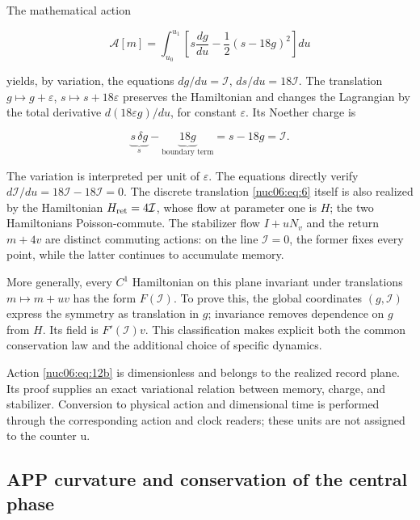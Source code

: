 The mathematical action

\begin{equation}
\mathscr A[m]=\int_{u_0}^{u_1}
\left[s\frac{dg}{du}-\frac12(s-18g)^2\right]du
\label{nuc06:eq:12b}
\end{equation}

yields, by variation, the equations \(dg/du=\mathcal I\), \(ds/du=18\mathcal I\). The translation \(g\mapsto g+\varepsilon\), \(s\mapsto s+18\varepsilon\) preserves the Hamiltonian and changes the Lagrangian by the total derivative \(d(18\varepsilon g)/du\), for constant \(\varepsilon\). Its Noether charge is

\begin{equation}
\underbrace{s\,\delta g}_{s}
-\underbrace{18g}_{\text{boundary term}}
=s-18g=\mathcal I.
\label{nuc06:eq:12c}
\end{equation}

The variation is interpreted per unit of \(\varepsilon\). The equations directly verify \(d\mathcal I/du=18\mathcal I-18\mathcal I=0\). The discrete translation \eqref{nuc06:eq:6} itself is also realized by the Hamiltonian \(H_{\rm ret}=4\mathcal I\), whose flow at parameter one is \(H\); the two Hamiltonians Poisson-commute. The stabilizer flow \(I+uN_v\) and the return \(m+4v\) are distinct commuting actions: on the line \(\mathcal I=0\), the former fixes every point, while the latter continues to accumulate memory.

More generally, every \(C^1\) Hamiltonian on this plane invariant under translations \(m\mapsto m+uv\) has the form \(F(\mathcal I)\). To prove this, the global coordinates \((g,\mathcal I)\) express the symmetry as translation in \(g\); invariance removes dependence on \(g\) from \(H\). Its field is \(F'(\mathcal I)v\). This classification makes explicit both the common conservation law and the additional choice of specific dynamics.

Action \eqref{nuc06:eq:12b} is dimensionless and belongs to the realized record plane. Its proof supplies an exact variational relation between memory, charge, and stabilizer. Conversion to physical action and dimensional time is performed through the corresponding action and clock readers; these units are not assigned to the counter u.

\subsection{APP curvature and conservation of the central phase}

